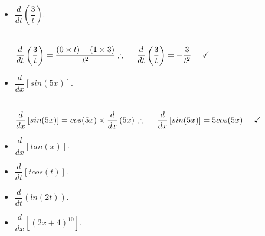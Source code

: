 \documentclass[fleqn]{article}
\begin{document}
\begin{enumerate}
\begin{itemize}
      \item $\dfrac{d}{dt} \left(\dfrac{3}{t}\right)$.

        \textcolor{hwColor}{
          \\
          $
            \dfrac{d}{dt} \left(\dfrac{3}{t}\right)=\dfrac{(0 \times t)-(1 \times 3)}{t^2}
            \\
            \\
            \\
            \therefore ~~~~ \dfrac{d}{dt} \left(\dfrac{3}{t}\right)=-\dfrac{3}{t^2} ~~~~ \checkmark
            \\
          $
        }

      \item $\dfrac{d}{dx} \left[sin(5x)\right]$.

        \textcolor{hwColor}{
          \\
          $
            \dfrac{d}{dx} \left[sin(5x)\right]=cos(5x) \times \dfrac{d}{dx} \left(5x\right)
            \\
            \\
            \\
            \therefore ~~~~ \dfrac{d}{dx} \left[sin(5x)\right]=5cos(5x) ~~~~ \checkmark
            \\
          $
        }

      \item $\dfrac{d}{dx} \left[tan(x)\right]$.



      \item $\dfrac{d}{dt} \left[t cos(t)\right]$.



      \item $\dfrac{d}{dt} \left(ln(2t)\right)$.



      \item $\dfrac{d}{dx} \left[\left(2x+4\right)^{10}\right]$.



\end{itemize}
\end{enumerate}
\end{document}
